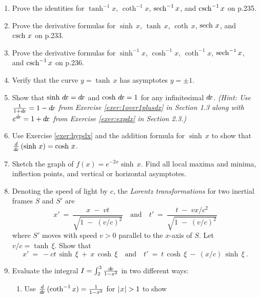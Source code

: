 {\begin{enumerate}[\bfseries 1.]
 \item Prove the identities for $\tanh^{-1} x$, $\coth^{-1} x$, $\operatorname{sech}^{-1} x$,
  and $\operatorname{csch}^{-1} x$ on p.235.
 \item Prove the derivative formulas for $\sinh\,x$, $\tanh\,x$, $\coth\,x$,
  $\operatorname{sech}\,x$, and $\operatorname{csch}\,x$ on p.233.
 \item Prove the derivative formulas for $\sinh^{-1} x$, $\cosh^{-1} x$,
  $\coth^{-1} x$, $\operatorname{sech}^{-1} x$, and $\operatorname{csch}^{-1} x$ on p.236.
 \item Verify that the curve $y=\tanh\,x$ has asymptotes $y=\pm 1$.
 \item\label{exer:hypdx} Show that $\sinh\,d\!x = d\!x$ and $\cosh\,d\!x=1$ for any
  infinitesimal $d\!x$. \emph{(Hint: Use $\tfrac{1}{1+d\!x} = 1 - d\!x$ from
  Exercise \ref{exer:1over1plusdx} in Section 1.3 along with $e^{d\!x}=1+d\!x$
  from Exercise \ref{exer:expdx} in Section 2.3.)}
 \item Use Exercise \ref{exer:hypdx} and the addition formula for $\sinh\,x$
  to show that $\frac{d}{d\!x}\,(\sinh\,x) = \cosh\,x$.
 \item Sketch the graph of $f(x)=e^{-2x} \sinh\,x$. Find all local maxima and
  minima, inflection points, and vertical or horizontal asymptotes.
 \item Denoting the speed of light by $c$, the
  \emph{Lorentz transformations} for two inertial
  frames $S$ and $S'$ are
\[
x' ~=~ \frac{x \;-\; vt}{\sqrt{1 \;-\; (v/c)^2}} \quad\text{and}\quad
t' ~=~ \frac{t \;-\; vx/c^2}{\sqrt{1 \;-\; (v/c)^2}}
\]
where $S'$ moves with speed $v>0$ parallel to the $x$-axis of $S$. Let
$v/c = \tanh\,\xi$. Show that
\[
x' ~=~ -ct\,\sinh\,\xi ~+~ x\,\cosh\,\xi \quad\text{and}\quad
t' ~=~ t\,\cosh\,\xi ~-~ (x/c)\,\sinh\,\xi ~.
\]
 \item Evaluate the integral $I=\int_2^3 \frac{d\!x}{1-x^2}$ in two different
 ways:
 \begin{enumerate}[\bfseries (a)]
  \item Use $\frac{d}{d\!x}\,(\coth^{-1} x) = \frac{1}{1-x^2}$ for $\lvert\mspace{1mu}x\mspace{1mu}\rvert > 1$ to show

\end{enumerate}
\end{enumerate}}
